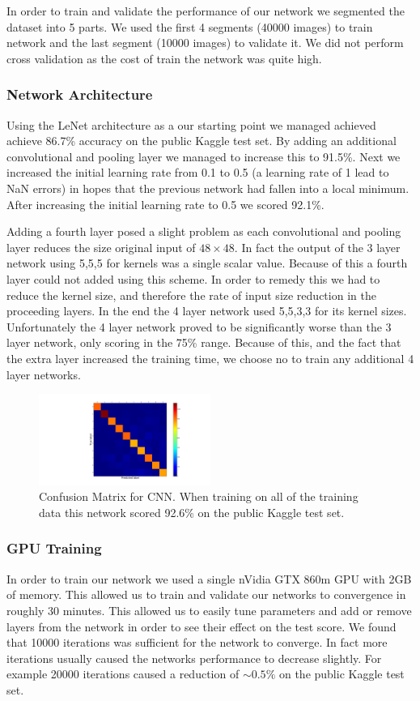 \documentclass[10pt,twocolumn]{article}
\begin{document}
In order to train and validate the performance of our network we segmented the dataset into 5 parts. We used the first 4 segments (40000 images) to train network and the last segment (10000 images) to validate it. We did not perform cross validation as the cost of train the network was quite high. 
\subsubsection{Network Architecture}
Using the LeNet architecture as a our starting point we managed achieved achieve 86.7\% accuracy on the public Kaggle test set. By adding an additional convolutional and pooling layer we managed to increase this to 91.5\%. Next we increased the initial learning rate from 0.1 to 0.5 (a learning rate of 1 lead to NaN errors) in hopes that the previous network had fallen into a local minimum. After increasing the initial learning rate to 0.5 we scored 92.1\%. 

Adding a fourth layer posed a slight problem as each convolutional and pooling layer reduces the size original input of $48 \times 48$. In fact the output of the 3 layer network using 5,5,5 for kernels was a single scalar value. Because of this a fourth layer could not added using this scheme. In order to remedy this we had to reduce the kernel size, and therefore the rate of input size reduction in the proceeding layers. In the end the 4 layer network used 5,5,3,3 for its kernel sizes. Unfortunately the 4 layer network proved to be significantly worse than the 3 layer network, only scoring in the 75\% range. Because of this, and the fact that the extra layer increased the training time, we choose no to train any additional 4 layer networks.

\begin{figure}
\includegraphics[trim=500 50 200 50,clip=true,width=0.5\textwidth]{./confusion.png}
\caption{Confusion Matrix for CNN. When training on all of the training data this network scored 92.6\% on the public Kaggle test set.}
\end{figure}
\subsubsection{GPU Training}
In order to train our network we used a single nVidia GTX 860m GPU with 2GB of memory. This allowed us to train and validate our networks to convergence in roughly 30 minutes. This allowed us to easily tune parameters and add or remove layers from the network in order to see their effect on the test score. We found that 10000 iterations was sufficient for the network to converge. In fact more iterations usually caused the networks performance to decrease slightly. For example 20000 iterations caused a reduction of $\sim 0.5\%$ on the public Kaggle test set. 
\end{document}
